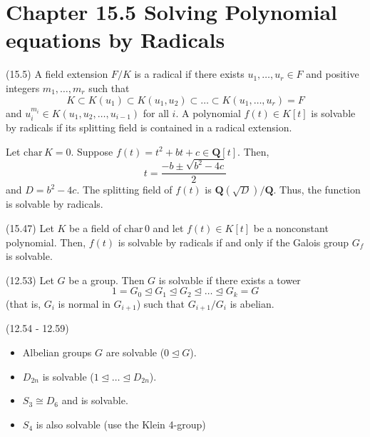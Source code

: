 \section{Chapter 15.5 Solving Polynomial equations by Radicals}
\begin{defi}
(15.5) A field extension $F/K$ is a radical if there exists $u_1,\ldots ,u_{r}\in F$ and positive integers $m_1,\ldots ,m_{r}$ such that
\[K\subset K(u_1)\subset K(u_1,u_2)\subset \ldots \subset K(u_1,\ldots ,u_{r})=F\]
and $u_{i}^{m_{i}}\in K(u_1,u_2,\ldots ,u_{i-1})$ for all $i$. A polynomial $f(t)\in K[t]$ is solvable by radicals if its splitting field is contained in a radical extension.
\end{defi}
\vspace{2ex}
\begin{ex}
Let $\mathrm{char}\,K=0$. Suppose $f(t)=t^2+bt+c\in {\bm Q}[t]$. Then,
\[t=\dfrac{-b\pm \sqrt{b^2-4c}}{2}\]
and $D=b^2-4c$. The splitting field of $f(t)$ is ${\bm Q}(\sqrt{D})/{\bm Q}$. Thus, the function is solvable by radicals. 
\end{ex}
\vspace{2ex}
\begin{thm}
(15.47) Let $K$ be a field of $\mathrm{char}\,0$ and let $f(t)\in K[t]$ be a nonconstant polynomial. Then, $f(t)$ is solvable by radicals if and only if the Galois group $G_{f}$ is solvable. 
\end{thm}
\vspace{2ex}
\begin{defi}
(12.53) Let $G$ be a group. Then $G$ is solvable if there exists a tower 
\[1=G_0\trianglelefteq G_1\trianglelefteq G_2\trianglelefteq \ldots \trianglelefteq G_{k}=G\]
(that is, $G_{i}$ is normal in $G_{i+1}$) such that $G_{i+1}/G_{i}$ is abelian. 
\end{defi}
\vspace{2ex}
\begin{ex}
(12.54 - 12.59) 
\begin{itemize}
\item[(i)] Albelian groups $G$ are solvable ($0\trianglelefteq G$).
\item[(ii)] $D_{2n}$ is solvable ($1\trianglelefteq \ldots \trianglelefteq D_{2n}$).
\item[(iii)] $S_3\cong D_6$ and is solvable.
\item[(iv)] $S_4$ is also solvable (use the Klein 4-group) 
\end{itemize}
\end{ex}
\vspace{2ex}
